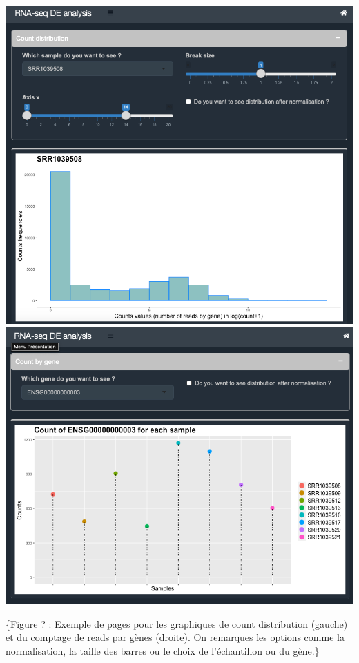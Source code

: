 \documentclass[
  12pt,
]{article}
\begin{document}
\begin{center}\includegraphics[width=1\linewidth,height=0.3\textheight]{countdistImage} \includegraphics[width=1\linewidth,height=0.3\textheight]{countGene} \end{center}

\sffamily\small\{Figure ? : Exemple de pages pour les graphiques de
count distribution (gauche) et du comptage de reads par gènes (droite).
On remarques les options comme la normalisation, la taille des barres ou
le choix de l'échantillon ou du gène.\}
\end{document}
